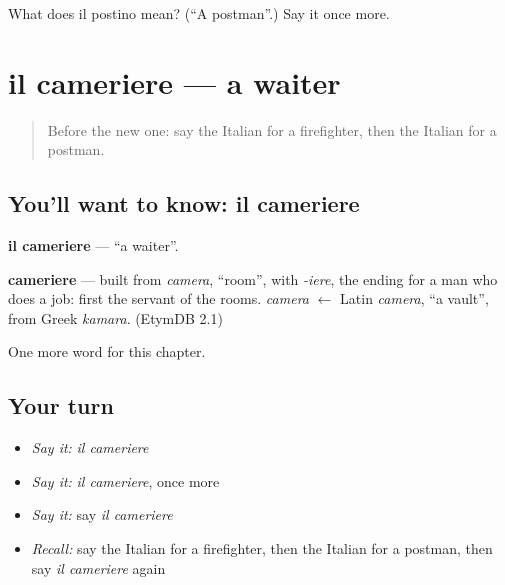 \begin{tcolorbox}[breakable,colback=teal!4,colframe=teal!35!black,title={Before you move on}]
What does il postino mean? (\textquotedblleft{}A postman\textquotedblright{}.) Say it once more.
\end{tcolorbox}
\section[il cameriere]{il cameriere — a waiter}

\label{lesson:IT-C113-cameriere}



\begin{quote}
Before the new one: say the Italian for a firefighter, then the Italian for a postman.
\end{quote}

\subsection*{You'll want to know: il cameriere}
\textbf{il cameriere} — \textquotedblleft{}a waiter\textquotedblright{}.

\begin{cousinweb}
\textbf{cameriere} — built from \emph{camera}, \textquotedblleft{}room\textquotedblright{}, with \emph{-iere}, the ending for a man who does a job: first the servant of the rooms. \emph{camera} $\leftarrow$ Latin \emph{camera}, \textquotedblleft{}a vault\textquotedblright{}, from Greek \emph{kamara}. (EtymDB 2.1)
\end{cousinweb}

\begin{grammarlens}[title={What you've built}]
One more word for this chapter.
\end{grammarlens}

\subsection*{Your turn}
\begin{itemize}
\raggedright
  \item \emph{Say it:} \emph{il cameriere}
  \item \emph{Say it:} \emph{il cameriere}, once more
  \item \emph{Say it:} say \emph{il cameriere}
  \item \emph{Recall:} say the Italian for a firefighter, then the Italian for a postman, then say \emph{il cameriere} again
\end{itemize}

